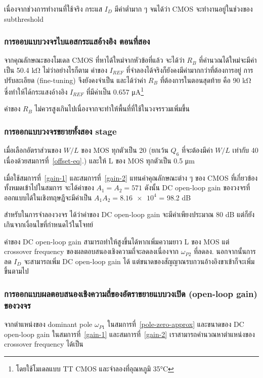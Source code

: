 \documentclass[a4paper, 11pt, oneside]{book} %
\begin{document}
เนื่องจากช่วงการทำงานที่ใช้จริง กระแส $I_D$ มีค่าต่ำมาก ๆ จนได้ว่า CMOS จะทำงานอยู่ในช่วงของ subthreshold

\subsubsection{การออบแบบวงจรไบแอสกระแสอ้างอิง ตอนที่สอง}

จากคุณลักษณะของโมเดล CMOS ที่หาได้ใหม่จากหัวข้อที่แล้ว จะได้ว่า $R_B$ ที่คำนวณได้ใหม่จะมีค่าเป็น 50.4 \si{\kilo\ohm} ไม่ว่าอย่างไรก็ตาม ค่าของ $I_{REF}$ ที่จำลองได้จริงก็ยังคงมีค่ามากกว่าที่ต้องการอยู่ การปรับละเอียด (fine-tuning) จึงยังคงจำเป็น และได้ว่าค่า $R_B$ ที่ต้องการในตอนสุดท้าย คือ 90 \si{\kilo\ohm} ซึ่งทำให้ได้กระแสงอ้างอิง $I_{REF}$ ที่มีค่าเป็น 0.657 \si{\micro A}\footnote{โดยใช้โมเดลแบบ TT CMOS และจำลองที่อุณหภูมิ 35\si{\degreeCelsius}}

ค่าของ $R_B$ ไม่ควรสูงเกินไปเนื่องจากจะทำให้พื้นที่ที่ใช้ในวงจรรวมเพิ่มขึ้น

\subsubsection{การออกแบบวงจรขยายทั้งสอง stage}

เมื่อเลือกอัตราส่วนของ $W/L$ ของ MOS ทุกตัวเป็น 20 (ยกเว้น $Q_6$ ที่จะต้องมีค่า $W/L$ เท่ากับ 40 เนื่องด้วยสมการที่~\ref{offset-eq}.) และให้ L ของ MOS ทุกตัวเป็น 0.5 \si{\micro m}

เมื่อใช้สมการที่~\ref{gain-1} และสมการที่~\ref{gain-2} แทนค่าคุณลักษณะต่าง ๆ ของ CMOS ที่เกี่ยวข้องทั้งหมดเข้าไปในสมการ จะได้ค่าของ $A_1 = A_2 = 571$ ดังนั้น DC open-loop gain ของวงจรที่ออกแบบได้ในเชิงทฤษฎีจะมีค่าเป็น $A_1A_2 = \num{8.16e4}$ = 98.2 dB 

สำหรับในการจำลองวงจร ได้ว่าค่าของ DC open-loop gain จะมีค่าเพียงประมาณ 80 dB แต่ก็ยังเกินจากเงื่อนไขที่กำหนดไว้ในโจทย์

ค่าของ DC open-loop gain สามารถทำให้สูงขึ้นได้หากเพิ่มความยาว L ของ MOS แต่ crossover frequency ของผลตอบสนองเชิงความถี่จะลดลงเนื่องจาก $\omega_{P2}$ ที่ลดลง. นอกจากนั้นการลด $I_D$ จะสามารถเพิ่ม DC open-loop gain ได้ แต่ขนาดของสัญญาณรบกวนอ้างอิงขาเข้าก็จะเพิ่มขึ้นตามไป

\subsubsection{การออกแบบผลตอบสนองเชิงความถี่ของอัตราขยายแบบวงเปิด (open-loop gain) ของวงจร}

จากตำแหน่งของ dominant pole $\omega_{P1}$ ในสมการที่~\ref{pole-zero-approx} และขนาดของ DC open-loop gain ในสมการที่~\ref{gain-1} และสมการที่~\ref{gain-2} เราสามารถคำนวณหาตำแหน่งของ crossover frequency ได้เป็น 
\end{document}
